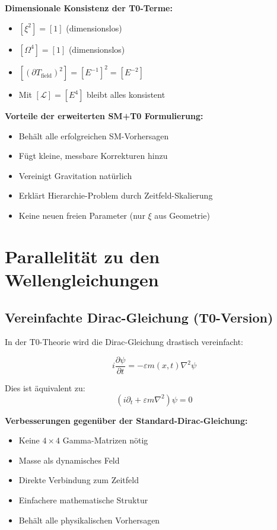	\textbf{Dimensionale Konsistenz der T0-Terme:}
	\begin{itemize}
		\item $[\xi^2] = [1]$ (dimensionslos)
		\item $[\Omega^4] = [1]$ (dimensionslos)
		\item $[(\partial T_{\text{field}})^2] = [E^{-1}]^2 = [E^{-2}]$
		\item Mit $[\mathcal{L}] = [E^4]$ bleibt alles konsistent
	\end{itemize}
	
	\textbf{Vorteile der erweiterten SM+T0 Formulierung:}
	\begin{itemize}
		\item Behält alle erfolgreichen SM-Vorhersagen
		\item Fügt kleine, messbare Korrekturen hinzu
		\item Vereinigt Gravitation natürlich
		\item Erklärt Hierarchie-Problem durch Zeitfeld-Skalierung
		\item Keine neuen freien Parameter (nur $\xi$ aus Geometrie)
	\end{itemize}
	
	\section{Parallelität zu den Wellengleichungen}
	
	\subsection{Vereinfachte Dirac-Gleichung (T0-Version)}
	
	In der T0-Theorie wird die Dirac-Gleichung drastisch vereinfacht:
	
	\begin{t0box}
		\begin{equation}
			i\frac{\partial\psi}{\partial t} = -\varepsilon m(x,t) \nabla^2 \psi
		\end{equation}
		
		Dies ist äquivalent zu:
		\begin{equation}
			(i\partial_t + \varepsilon m \nabla^2)\psi = 0
		\end{equation}
	\end{t0box}
	
	\textbf{Verbesserungen gegenüber der Standard-Dirac-Gleichung:}
	\begin{itemize}
		\item Keine $4 \times 4$ Gamma-Matrizen nötig
		\item Masse als dynamisches Feld
		\item Direkte Verbindung zum Zeitfeld
		\item Einfachere mathematische Struktur
		\item Behält alle physikalischen Vorhersagen
	\end{itemize}
	
